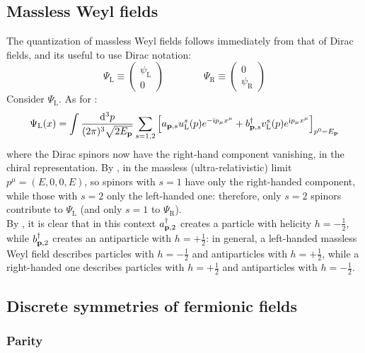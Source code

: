 \subsection{Massless Weyl fields}

The quantization of massless Weyl fields follows immediately from that of Dirac fields, and its useful to use Dirac notation:
\begin{equation*}
  \Psi_\text{L} \equiv
  \begin{pmatrix}
    \psi_\text{L} \\ 0
  \end{pmatrix}
  \qquad \qquad
  \Psi_\text{R} \equiv
  \begin{pmatrix}
    0 \\ \psi_\text{R}
  \end{pmatrix}
\end{equation*}
Consider $ \Psi_\text{L} $. As for :
\begin{equation*}
  \Psi_\text{L}(x) = \int \frac{\mathrm{d}^3p}{(2\pi)^3 \sqrt{2E_{\mathbf{p}}}} \sum_{s = 1,2} \left[ a_{\mathbf{p},s} u_\text{L}^s(p) e^{-\mathrm{i} p_\mu x^\mu} + b_{\mathbf{p},s}^\dagger v_\text{L}^s(p) e^{\mathrm{i} p_\mu x^\mu} \right]_{p^0 = E_{\mathbf{p}}}
\end{equation*}
where the Dirac spinors now have the right-hand component vanishing, in the chiral representation. By , in the massless (ultra-relativistic) limit $ p^\mu = (E,0,0,E) $, so spinors with $ s = 1 $ have only the right-handed component, while those with $ s = 2 $ only the left-handed one: therefore, only $ s = 2 $ spinors contribute to $ \Psi_\text{L} $ (and only $ s = 1 $ to $ \Psi_\text{R} $).\\
By , it is clear that in this context $ a_{\mathbf{p},2}^\dagger $ creates a particle with helicity $ h = - \frac{1}{2} $, while $ b_{\mathbf{p},2}^\dagger $ creates an antiparticle with $ h = + \frac{1}{2} $: in general, a left-handed massless Weyl field describes particles with $ h = - \frac{1}{2} $ and antiparticles with $ h = + \frac{1}{2} $, while a right-handed one describes particles with $ h = + \frac{1}{2} $ and antiparticles with $ h = - \frac{1}{2} $.

\subsection{Discrete symmetries of fermionic fields}

\subsubsection{Parity}

